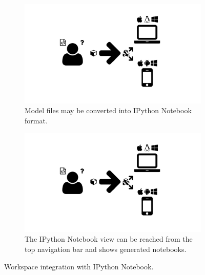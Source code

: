 \begin{figure}
  \centering
  \begin{subfigure}[b]{\textwidth}
    \includegraphics[width=\textwidth,page=12,trim=0.37cm 3.65cm 13.1cm 3.3cm, clip=true]{images/Figures.pdf}
    \caption{Model files may be converted into IPython Notebook format.}
    \label{Figure:carbon-workspace-convert-to-ipython}
  \end{subfigure}
  \begin{subfigure}[b]{\textwidth}
    \includegraphics[width=\textwidth,page=12,trim=13.1cm 3.65cm 0.37cm 3.3cm, clip=true]{images/Figures.pdf}
    \caption{The IPython Notebook view can be reached from the top navigation bar and shows generated notebooks.}
    \label{Figure:carbon-workspace-ipython-view}
  \end{subfigure}
  \caption{Workspace integration with IPython Notebook.}
  \label{Figure:carbon-workspace-ipython-integration}
\end{figure}

